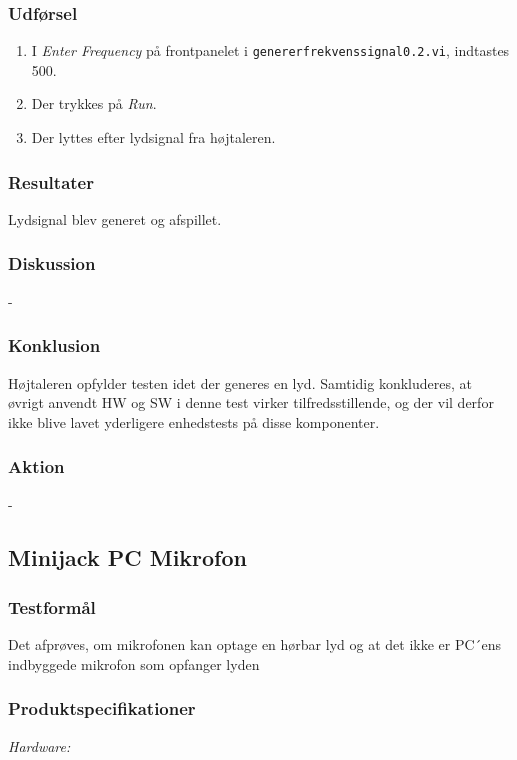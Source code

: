 		\subsubsection{Udførsel}
			\begin{enumerate}
				\item I \textit{Enter Frequency} på frontpanelet i \texttt{genererfrekvenssignal0.2.vi}, indtastes 500. 
				\item Der trykkes på \textit{Run}. 
				\item Der lyttes efter lydsignal fra højtaleren.  
			\end{enumerate}
			
		\subsubsection{Resultater}
		Lydsignal blev generet og afspillet. 
		\subsubsection{Diskussion} 
		-
		\subsubsection{Konklusion}
		Højtaleren opfylder testen idet der generes en lyd. Samtidig konkluderes, at øvrigt anvendt HW og SW i denne test virker tilfredsstillende, og der vil derfor ikke blive lavet yderligere enhedstests på disse komponenter. 
	
		\subsubsection{Aktion}
		- 
	\subsection{Minijack PC Mikrofon}
		\subsubsection{Testformål}
		Det afprøves, om mikrofonen kan optage en hørbar lyd og at det ikke er PC´ens indbyggede mikrofon som opfanger lyden 
		\subsubsection{Produktspecifikationer}
	
			\textit{Hardware:}\\
			\mikrofon\\
			\PC\\
	
